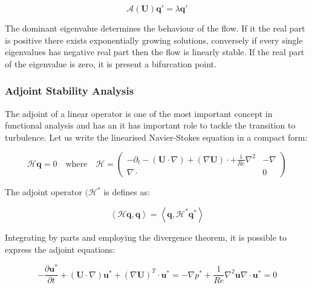 \begin{equation}
   \mathcal{A}(\mathbf{U})\mathbf{q'}=\lambda \mathbf{q'}
\end{equation}

The dominant eigenvalue determines the behaviour of the flow. If it the real part is positive there exists exponentially growing solutions, conversely if every single eigenvalues has negative real part then the flow is linearly stable. If the real part of the eigenvalue is zero, it is present a bifurcation point.

\subsubsection{Adjoint Stability Analysis}

The adjoint of a linear operator is one of the most important concept in functional analysis and has an it has important role to tackle the transition to turbulence. Let us write the linearised Navier-Stokes equation in a compact form:

\begin{equation}
\mathcal{H}\mathbf{q}=0 \quad \mbox{where} \quad \mathcal{H}=\left( \begin{array}{c|c}
  -\partial_t-(\mathbf{U} \cdot \nabla)+ (\nabla \mathbf{U}) \cdot + \frac{1}{Re} \nabla^2 & -\nabla \\
  \hline
  \nabla \cdot  & 0
   \end{array}
 \right)
 \end{equation}
 
 
The adjoint operator $(\mathcal{H}^*$ is defines as:

\begin{equation}
\left \langle \mathcal{H}\mathbf{q}, \mathbf{q} \right \rangle= \left \langle \mathbf{q}, \mathcal{H}^*\mathbf{q}^* \right \rangle
\end{equation}

Integrating by parts and employing the divergence theorem, it is possible to express the adjoint equations:

\begin{subequations}
\begin{equation}
-\frac{\partial \mathbf{u}^*}{\partial t}+(\mathbf{U} \cdot \nabla)\mathbf{u}^*+(\nabla \mathbf{U})^T \cdot \mathbf{u}^*=-\nabla p^*+\frac{1}{Re} \nabla^2 \mathbf{u}
\end{equation}

\begin{equation}
\nabla \cdot \mathbf{u}^*=0
\end{equation}
\end{subequations}

